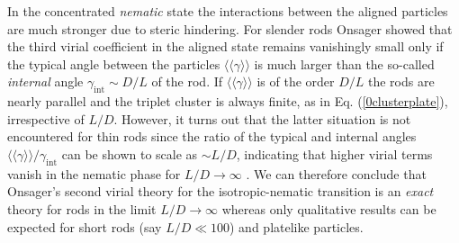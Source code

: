 \documentclass[amssymb]{revtex4}
\begin{document}
In the concentrated {\em nematic} state the interactions between the aligned particles are much  
stronger due to steric hindering. For slender rods Onsager showed that the third virial coefficient in the aligned state 
remains vanishingly small  only if the typical angle between the particles $\langle\langle \gamma \rangle\rangle $ is much larger than the so-called 
{\em internal} angle $\gamma_{\text{int}}\sim D/L$ of the
rod.  If $\langle\langle \gamma \rangle\rangle$ is of the order $D/L$ the rods are nearly parallel 
and the triplet cluster is always finite, as in Eq. (\ref{0clusterplate}), irrespective of $L/D$.
However, it turns out that the latter situation is not encountered for thin rods 
since the ratio of the typical and internal angles $\langle\langle \gamma \rangle\rangle /\gamma_{\text{int}}$  can be shown to scale as $\sim L/D$, indicating
that higher virial terms vanish in the nematic phase  for $L/D\rightarrow \infty$ \cite{Vroege92}. 
We can therefore conclude that  Onsager's  second virial theory for the isotropic-nematic transition
is an {\em exact} theory for rods in the limit $L/D \rightarrow \infty$ whereas  only qualitative results
can be expected for short rods (say $L/D\ll 100$) and  platelike particles.
\end{document}
